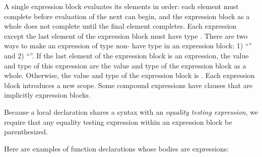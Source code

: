 A single expression block evaluates its elements in order: each
element must complete before evaluation of the next can begin, and the
expression block as a whole does not complete until the final element completes.
Each expression except the last element of the expression block
must have type \TYP{()}.
There are two ways to make an expression  of type non-\TYP{()}
have type \TYP{()} in an expression block:
1) ``'' and 2) ``''.
If the last element of the expression block is an
expression, the value and type of this expression are the value and
type of the expression block as a whole.  Otherwise, the value and
type of the expression block is \EXP{()}.  Each expression block
introduces a new scope.  Some compound expressions have clauses that
are implicitly expression blocks.

Because a local declaration shares a syntax with an
\emph{equality testing expression}, we require that any equality testing
expression within an expression block be parenthesized.


Here are examples of function
declarations whose bodies are  expressions:









